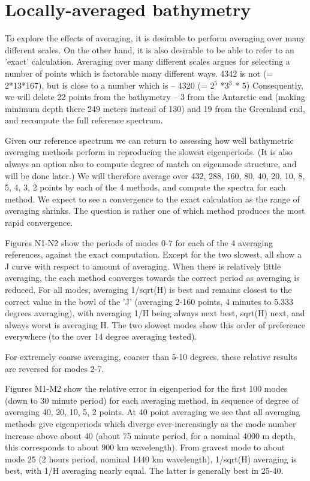 \section{Locally-averaged bathymetry}

  To explore the effects of averaging, it is desirable to perform 
averaging over many different scales.  On the other hand, it is
also desirable to be able to refer to an 'exact' calculation.
Averaging over many different scales argues for selecting a number
of points which is factorable many different ways.  4342 is not
(= 2*13*167), but is close to a number which is -- 4320 (= 2$^5$ *3$^3$ * 5)
Consequently, we will delete 22 points from the bathymetry -- 
3 from the Antarctic end (making minimum depth there 249 meters
instead of 130) and 19 from the Greenland end, and recompute the
full reference spectrum.

  Given our reference spectrum we can return to assessing how 
well bathymetric averaging methods perform in reproducing the
slowest eigenperiods.  (It is also always an option also to compute
degree of match on eigenmode structure, and will be done later.)
We will therefore average over 432, 288, 160, 80, 40, 20, 10, 8, 5, 4, 3, 2
points 
by each of the 4 methods, and compute the spectra for each method.
We expect to see a convergence to the exact calculation as the range 
of averaging shrinks.  The question is rather one of which method
produces the most rapid convergence.

  Figures N1-N2 show the periods of modes 0-7 for each of the 4 
averaging references, against the exact computation.  Except for
the two slowest, all show a J curve with respect to amount of averaging.
When there is relatively little averaging, the each method converges towards 
the correct period as averaging is reduced.  For all modes, averaging
1/sqrt(H) is best and remains closest to the correct value in the bowl
of the 'J' (averaging 2-160 points, 4 minutes to 5.333 degrees averaging),
with averaging 1/H being always next best, sqrt(H) next, and always worst
is averaging H.  The two slowest modes show this order of preference 
everywhere (to the over 14 degree averaging tested). 

  For extremely coarse averaging, coarser than 5-10 degrees, these
relative results are reversed for modes 2-7. 

  Figures M1-M2 show the relative error in eigenperiod for the first
100 modes (down to 30 minute period) for each averaging method, in
sequence of degree of averaging 40, 20, 10, 5, 2 points.  At 40 point
averaging we see that all averaging methods give eigenperiods which 
diverge ever-increasingly as the mode number increase above about 40
(about 75 minute period, for a nominal 4000 m depth, this corresponds
to about 900 km wavelength).  From gravest mode to about mode 25 (2 hours
period, nominal 1440 km wavelength), 1/sqrt(H) averaging is best, with
1/H averaging nearly equal.  The latter is generally best in 25-40.

